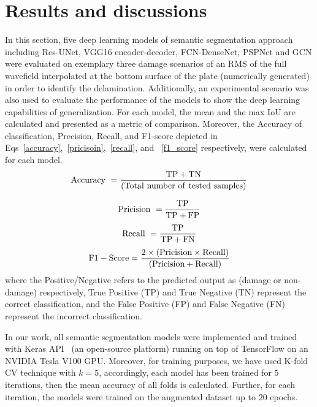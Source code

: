 \section{Results and discussions}
\label{section:results_and_discussions}
In this section, five deep learning models  of semantic segmentation approach including  Res-UNet, VGG16 encoder-decoder, FCN-DenseNet, PSPNet and GCN were evaluated on exemplary three damage scenarios of an RMS of the full wavefield interpolated at the bottom surface of the plate (numerically generated) in order to identify the delamination.
Additionally, an experimental scenario was also used to evaluate the performance of the models to show the deep learning capabilities of generalization.
For each model, the mean and the max IoU are calculated and presented as a metric of comparison.
Moreover, the Accuracy of classification, Precision, Recall, and F1-score depicted in Eqs~\ref{accuracy},~\ref{pricisoin},~\ref{recall}, and ~\ref{f1_score} respectively, were calculated for each model.
\begin{equation}
	\rm Accuracy\ = \frac{TP+TN}{(Total\ number\ of\ tested\ samples)}
	\label{accuracy}
\end{equation}

\begin{equation}
	\rm Pricision\ =\frac{TP}{TP+FP}
	\label{pricisoin}
\end{equation}
\begin{equation}
	\rm Recall\ = \frac{TP}{TP+ FN}
	\label{recall}
\end{equation}
\begin{equation}
	\rm F1-Score =\frac{2 \times (Pricision\times Recall)}{(Pricision + Recall)} 
	\label{f1_score}
\end{equation}
where the Positive/Negative refers to the predicted output as (damage or non-damage) respectively, True Positive (TP) and True Negative (TN)  represent the correct classification, and the False Positive (FP) and False Negative (FN) represent the incorrect classification.

In our work, all semantic segmentation models were implemented and trained with Keras API~\cite{chollet2015keras} (an open-source platform) running on top of TensorFlow on an NVIDIA Tesla V100 GPU. 
Moreover, for training purposes, we have used K-fold CV technique with \(k=5\), accordingly, each model has been trained for \(5\) iterations, then the mean accuracy of all folds is calculated. 
Further, for each iteration, the models were trained on the augmented dataset up to \(20\) epochs.


